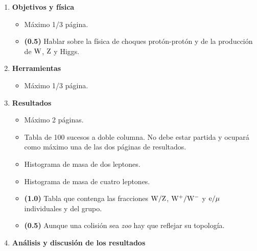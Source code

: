 \documentclass[11pt]{articulo}
\begin{document}
\begin{enumerate}
\begin{itemize}
\end{itemize}

\item {\bf Objetivos y f\'isica}

\begin{itemize}

\item M\'aximo 1/3 p\'agina.

\item {\bf (0.5)} Hablar sobre la f\'isica de choques prot\'on-prot\'on y de la producci\'on de ${\rm W}$, ${\rm Z}$ y Higgs.

\end{itemize}

\item {\bf Herramientas}

\begin{itemize}

\item M\'aximo 1/3 p\'agina.

\end{itemize}

\item {\bf Resultados}

\begin{itemize}

\item M\'aximo 2 p\'aginas.

\item Tabla de 100 sucesos a doble columna. No debe estar partida y ocupar\'a como m\'aximo una de las dos p\'aginas de resultados.

\item Histograma de masa de dos leptones.

\item Histograma de masa de cuatro leptones.

\item {\bf (1.0)} Tabla que contenga las fracciones ${\rm W/Z}$, ${\rm W^+/W^-}$ y ${\rm e/\mu}$ individuales y del grupo.

\item {\bf (0.5)} Aunque una colisi\'on sea {\it zoo} hay que reflejar su topolog\'ia.

\end{itemize}

\newpage

\item {\bf An\'alisis y discusi\'on de los resultados}

\begin{itemize}


\end{itemize}
\end{enumerate}
\end{document}
